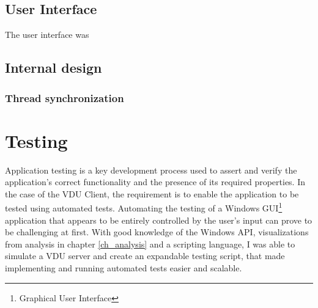 \section{User Interface}
The user interface was 

\section{Internal design}

\subsection{Thread synchronization}

\section{}

\chapter{Testing}
\label{ch_testing}
Application testing is a key development process used to assert and verify the application's correct functionality and the presence of its required properties. In the case of the VDU Client, the requirement is to enable the application to be tested using automated tests. Automating the testing of a Windows GUI\footnote{Graphical User Interface} application that appears to be entirely controlled by the user's input can prove to be challenging at first. With good knowledge of the Windows API, visualizations from analysis in chapter \ref{ch_analysis} and a scripting language, I was able to simulate a VDU server and create an expandable testing script, that made implementing and running automated tests easier and scalable.

